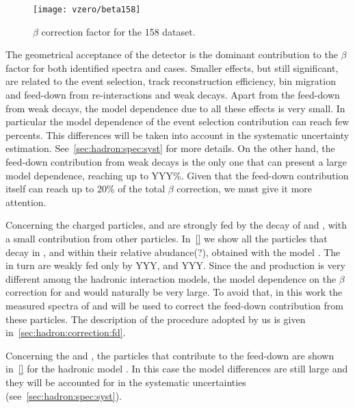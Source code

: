 \begin{figure}
  \centering
  \texttt{[image: vzero/beta158]}
  
  \caption{$\beta$ correction factor for the 158 \GeVc dataset.}
  \label{fig:hadron:correction:beta:vzero158}
\end{figure}

The geometrical acceptance of the detector
is the dominant contribution to the $\beta$ factor
for both identified spectra and \vzero cases.
Smaller effects, but still significant, are related
to the event selection, track reconstruction efficiency, 
bin migration and feed-down from re-interactions and weak decays.
Apart from the feed-down from weak decays,
the model dependence due to all these effects is very small.
In particular the model dependence of the event selection
contribution can reach few percents. This differences
will be taken into account in the systematic uncertainty estimation.
See~\cref{sec:hadron:spec:syst} for more details.
On the other hand, the feed-down contribution from weak decays
is the only one that can present a large model
dependence, reaching up to YYY\%.  
Given that the feed-down contribution itself
can reach up to 20\% of the total $\beta$
correction, we must give it more attention.


Concerning the charged particles, \pions and \protons
are strongly fed by the decay of \lambs and \kzeros,
with a small contribution from other particles.
In~\cref{} we show all the particles that decay in
\pions, \kaons and \protons within their relative abudance(?),
obtained with the model \EposLong.
The \kaons in turn are weakly fed only by YYY, and YYY.
Since the \lambs and \kzeros production is very different
among the hadronic interaction models, the model dependence
on the $\beta$ correction for \pions and \protons would
naturally be very large. To avoid that, in this work the
measured spectra of \lambs and \kzeros will be used
to correct the feed-down contribution from these particles.
The description of the procedure adopted by us is given
in~\cref{sec:hadron:correction:fd}.


Concerning the \lambs and \kzeros,
the particles that contribute to the feed-down
are shown in~\cref{} for the hadronic model \EposLong.
In this case the model differences are still
large and they will be accounted for in the systematic
uncertainties (see~\cref{sec:hadron:spec:syst}). 



